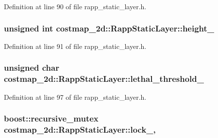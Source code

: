 Definition at line 90 of file rapp\-\_\-static\-\_\-layer.\-h.

\hypertarget{classcostmap__2d_1_1RappStaticLayer_a1e8fa4631dfd2c0973498acffdde25f0}{
\subsubsection[{height\-\_\-}]{\setlength{\rightskip}{0pt plus 5cm}unsigned int costmap\-\_\-2d\-::\-Rapp\-Static\-Layer\-::height\-\_\-\hspace{0.3cm}{\ttfamily [private]}}}\label{classcostmap__2d_1_1RappStaticLayer_a1e8fa4631dfd2c0973498acffdde25f0}


Definition at line 91 of file rapp\-\_\-static\-\_\-layer.\-h.

\hypertarget{classcostmap__2d_1_1RappStaticLayer_aca5230d14fdd4ad09de3c22b3488a2e6}{
\subsubsection[{lethal\-\_\-threshold\-\_\-}]{\setlength{\rightskip}{0pt plus 5cm}unsigned char costmap\-\_\-2d\-::\-Rapp\-Static\-Layer\-::lethal\-\_\-threshold\-\_\-\hspace{0.3cm}{\ttfamily [private]}}}\label{classcostmap__2d_1_1RappStaticLayer_aca5230d14fdd4ad09de3c22b3488a2e6}


Definition at line 97 of file rapp\-\_\-static\-\_\-layer.\-h.

\hypertarget{classcostmap__2d_1_1RappStaticLayer_ab8eef08e36456dbd1ca2291600d6dc23}{
\subsubsection[{lock\-\_\-}]{\setlength{\rightskip}{0pt plus 5cm}boost\-::recursive\-\_\-mutex costmap\-\_\-2d\-::\-Rapp\-Static\-Layer\-::lock\-\_\-\hspace{0.3cm}{\ttfamily [mutable]}, {\ttfamily [private]}}}\label{classcostmap__2d_1_1RappStaticLayer_ab8eef08e36456dbd1ca2291600d6dc23}


